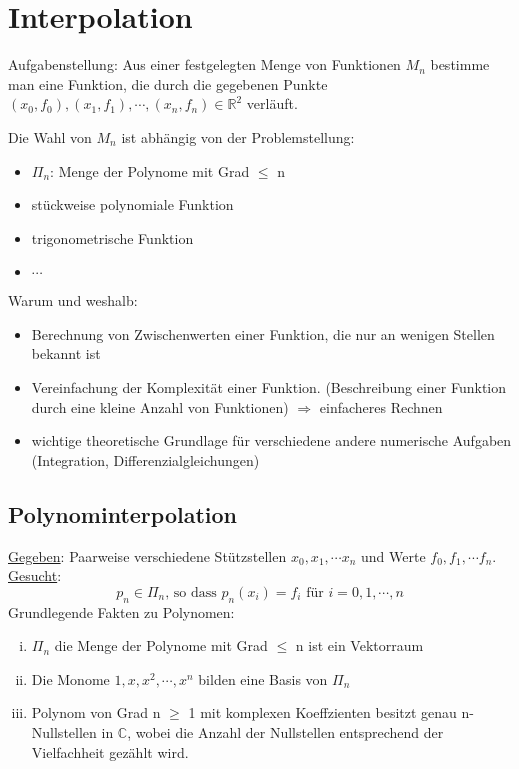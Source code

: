 \section{Interpolation}
Aufgabenstellung: Aus einer festgelegten Menge von Funktionen $M_n$ 
bestimme man eine Funktion, die durch die gegebenen Punkte
$(x_0, f_0), (x_1, f_1), \cdots, (x_n, f_n) \in \mathbb{R}^2$ verläuft.

Die Wahl von $M_n$ ist abhängig von der Problemstellung:
\begin{itemize}
  \item $\Pi_n$: Menge der Polynome mit Grad $\leq$ n
  \item stückweise polynomiale Funktion
  \item trigonometrische Funktion
	\item $\cdots$
\end{itemize}
Warum und weshalb:
\begin{itemize}
  \item Berechnung von Zwischenwerten einer Funktion, die nur an wenigen 
    Stellen bekannt ist
  \item Vereinfachung der Komplexität einer Funktion. (Beschreibung
    einer Funktion durch eine kleine Anzahl von Funktionen) $\Rightarrow$
    einfacheres Rechnen
  \item wichtige theoretische Grundlage für verschiedene andere numerische
    Aufgaben (Integration, Differenzialgleichungen)
\end{itemize}

\subsection{Polynominterpolation}
\underline{Gegeben}: Paarweise verschiedene Stützstellen $x_0, x_1, \cdots x_n$ und
Werte $f_0, f_1, \cdots f_n$.\\
\underline{Gesucht}:
\begin{equation*}
  \tag{2.1} p_n \in  \Pi_n \text{, so dass } p_n(x_i) = 
  f_i \text{ für } i = 0, 1, \cdots ,n
\end{equation*}
Grundlegende Fakten zu Polynomen:
\begin{enumerate}[(i)]
  \item $\Pi_n$ die Menge der Polynome mit Grad $\leq$ n ist ein Vektorraum
  \item Die Monome $1, x, x^2, \cdots, x^n$ bilden eine Basis von $\Pi_n$
  \item Polynom von Grad n $\geq$ 1 mit komplexen Koeffzienten besitzt genau n-Nullstellen
    in $\mathbb{C}$, wobei die Anzahl der Nullstellen entsprechend der Vielfachheit
    gezählt wird.
\end{enumerate}
